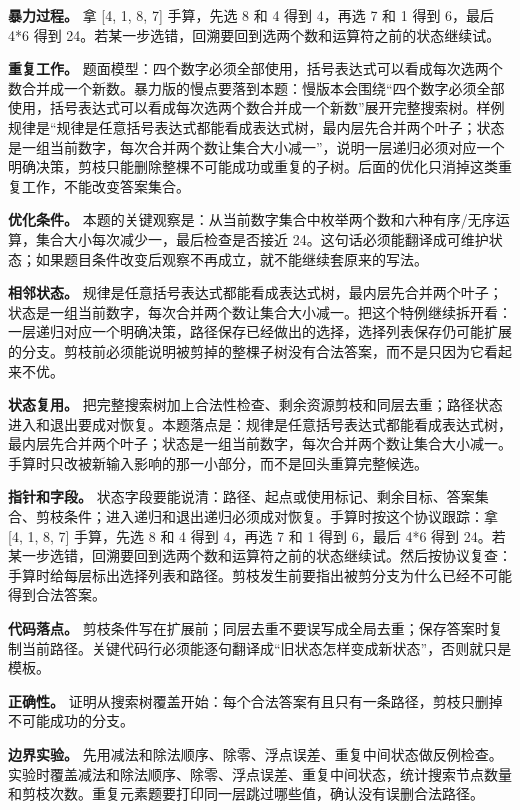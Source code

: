 \textbf{暴力过程。} 拿 [4, 1, 8, 7] 手算，先选 8 和 4 得到 4，再选 7 和 1 得到 6，最后 4*6 得到 24。若某一步选错，回溯要回到选两个数和运算符之前的状态继续试。

\textbf{重复工作。} 题面模型：四个数字必须全部使用，括号表达式可以看成每次选两个数合并成一个新数。暴力版的慢点要落到本题：慢版本会围绕“四个数字必须全部使用，括号表达式可以看成每次选两个数合并成一个新数”展开完整搜索树。样例规律是“规律是任意括号表达式都能看成表达式树，最内层先合并两个叶子；状态是一组当前数字，每次合并两个数让集合大小减一”，说明一层递归必须对应一个明确决策，剪枝只能删除整棵不可能成功或重复的子树。后面的优化只消掉这类重复工作，不能改变答案集合。

\textbf{优化条件。} 本题的关键观察是：从当前数字集合中枚举两个数和六种有序/无序运算，集合大小每次减少一，最后检查是否接近 24。这句话必须能翻译成可维护状态；如果题目条件改变后观察不再成立，就不能继续套原来的写法。

\textbf{相邻状态。} 规律是任意括号表达式都能看成表达式树，最内层先合并两个叶子；状态是一组当前数字，每次合并两个数让集合大小减一。把这个特例继续拆开看：一层递归对应一个明确决策，路径保存已经做出的选择，选择列表保存仍可能扩展的分支。剪枝前必须能说明被剪掉的整棵子树没有合法答案，而不是只因为它看起来不优。

\textbf{状态复用。} 把完整搜索树加上合法性检查、剩余资源剪枝和同层去重；路径状态进入和退出要成对恢复。本题落点是：规律是任意括号表达式都能看成表达式树，最内层先合并两个叶子；状态是一组当前数字，每次合并两个数让集合大小减一。手算时只改被新输入影响的那一小部分，而不是回头重算完整候选。

\textbf{指针和字段。} 状态字段要能说清：路径、起点或使用标记、剩余目标、答案集合、剪枝条件；进入递归和退出递归必须成对恢复。手算时按这个协议跟踪：拿 [4, 1, 8, 7] 手算，先选 8 和 4 得到 4，再选 7 和 1 得到 6，最后 4*6 得到 24。若某一步选错，回溯要回到选两个数和运算符之前的状态继续试。然后按协议复查：手算时给每层标出选择列表和路径。剪枝发生前要指出被剪分支为什么已经不可能得到合法答案。

\textbf{代码落点。} 剪枝条件写在扩展前；同层去重不要误写成全局去重；保存答案时复制当前路径。关键代码行必须能逐句翻译成“旧状态怎样变成新状态”，否则就只是模板。

\textbf{正确性。} 证明从搜索树覆盖开始：每个合法答案有且只有一条路径，剪枝只删掉不可能成功的分支。

\textbf{边界实验。} 先用减法和除法顺序、除零、浮点误差、重复中间状态做反例检查。实验时覆盖减法和除法顺序、除零、浮点误差、重复中间状态，统计搜索节点数量和剪枝次数。重复元素题要打印同一层跳过哪些值，确认没有误删合法路径。

